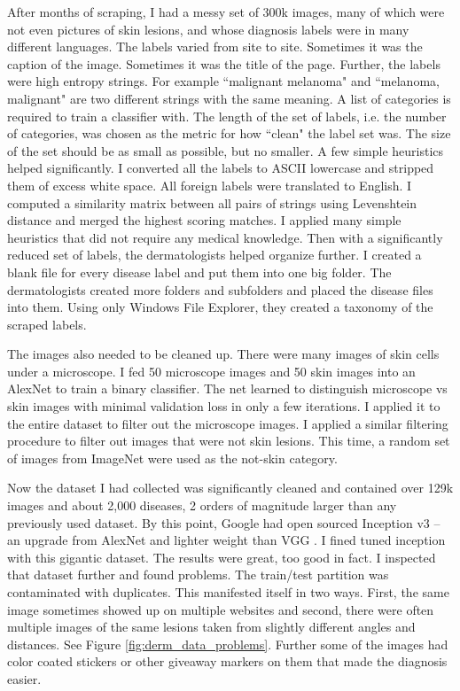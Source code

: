 After months of scraping, I had a messy set of 300k images, many of which were not even pictures of skin lesions, and whose diagnosis labels were in many different languages.  The labels varied from site to site.  Sometimes it was the caption of the image.  Sometimes it was the title of the page.  Further, the labels were high entropy strings.  For example ``malignant melanoma" and ``melanoma, malignant" are two different strings with the same meaning.  A list of categories is required to train a classifier with.  The length of the set of labels, i.e. the number of categories, was chosen as the metric for how ``clean" the label set was.  The size of the set should be as small as possible, but no smaller.  A few simple heuristics helped significantly. I converted all the labels to ASCII lowercase and stripped them of excess white space.  All foreign labels were translated to English. I computed a similarity matrix between all pairs of strings using Levenshtein distance and merged the highest scoring matches.  I applied many simple heuristics that did not require any medical knowledge.  Then with a significantly reduced set of labels, the dermatologists helped organize further.  I created a blank file for every disease label and put them into one big folder.  The dermatologists created more folders and subfolders and placed the disease files into them.  Using only Windows File Explorer, they created a taxonomy of the scraped labels.

The images also needed to be cleaned up.  There were many images of skin cells under a microscope.  I fed 50 microscope images and 50 skin images into an AlexNet to train a binary classifier.  The net learned to distinguish microscope vs skin images with minimal validation loss in only a few iterations.  I applied it to the entire dataset to filter out the microscope images.  I applied a similar filtering procedure to filter out images that were not skin lesions.  This time, a random set of images from ImageNet were used as the not-skin category.

Now the dataset I had collected was significantly cleaned and contained over 129k images and about 2,000 diseases, 2 orders of magnitude larger than any previously used dataset.  By this point, Google had open sourced Inception v3 \cite{szegedy2016rethinking} -- an upgrade from AlexNet \cite{krizhevsky2012imagenet} and lighter weight than VGG \cite{simonyan2014very}.  I fined tuned inception with this gigantic dataset.  The results were great, too good in fact.  I inspected that dataset further and found problems. The train/test partition was contaminated with duplicates.  This manifested itself in two ways.  First, the same image sometimes showed up on multiple websites and second, there were often multiple images of the same lesions taken from slightly different angles and distances.  See Figure \ref{fig:derm_data_problems}.  Further some of the images had color coated stickers or other giveaway markers on them that made the diagnosis easier.

